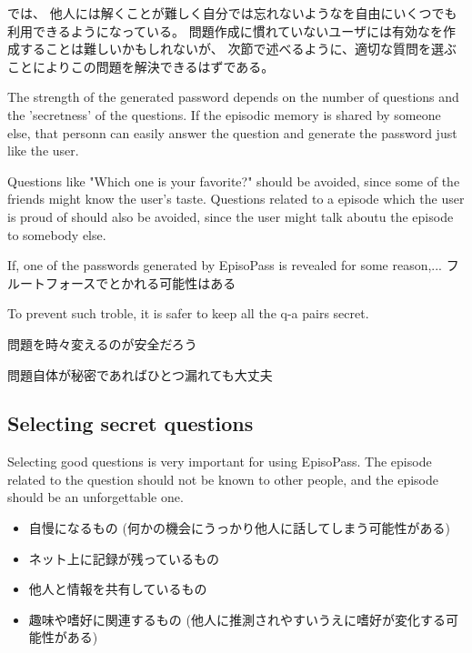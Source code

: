 \documentclass{article}
\begin{document}
{\EP}では、
他人には解くことが難しく自分では忘れないような{\SQ}を自由にいくつでも利用できるようになっている。
問題作成に慣れていないユーザには有効な{\SQ}を作成することは難しいかもしれないが、
次節で述べるように、適切な質問を選ぶことによりこの問題を解決できるはずである。

The strength of the generated password depends on the number of
questions and the 'secretness' of the questions.
If the episodic memory is shared by someone else,
that personn can easily answer the question and generate the
password just like the user.

Questions like "Which one is your favorite?" should be avoided,
since some of the friends might know the user's taste.
Questions related to a episode which the user is proud of should also be
avoided, since the user might talk aboutu the episode to somebody else.

If, one of the passwords generated by EpisoPass is revealed
for some reason,... フルートフォースでとかれる可能性はある

To prevent such troble, it is safer to keep all the q-a pairs secret.

問題を時々変えるのが安全だろう

問題自体が秘密であればひとつ漏れても大丈夫

\subsection{Selecting secret questions}


Selecting good questions is very important for using EpisoPass.
The episode related to the question should not be known to other people,
and the episode should be an unforgettable one.
%

\begin{itemize}
\item \textsf{自慢になるもの
(何かの機会にうっかり他人に話してしまう可能性がある)}

\vspace{-1mm}
\item \textsf{ネット上に記録が残っているもの}

\vspace{-1mm}
\item \textsf{他人と情報を共有しているもの}

\vspace{-1mm}
\item \textsf{趣味や嗜好に関連するもの
(他人に推測されやすいうえに嗜好が変化する可能性がある)}

\end{itemize}
\end{document}
